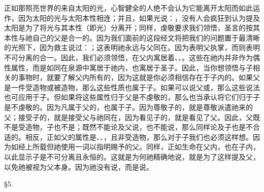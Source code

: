 正如那照亮世界的来自太阳的光，心智健全的人绝不会认为它能离开太阳而如此运作，因为太阳的光与太阳本性相连；并且，如果光说：，没有人会疯狂到认为提及太阳是为了将光与其本性（即光）分离开；同样，虔敬要求我们领悟，圣言的按其本性与祂自己的父是合一的。因为我们面前的这段经文将把我们的问题置于最清晰的光照下，因为救主说过：；这表明祂永远与父同在。因为表明父执掌，而则表明不可分离的合一。因此，我们必须领悟，在父内寓居着、、。这些在祂内并非作为偶性属性，而是如同在泉源中寓居于祂内，也寓居于圣子。因此，当你想领悟与子相关的事物时，就要了解父内所有的，因为这就是你必须相信存在于子内的。如果父是一件受造物或被造物，那么这些性质也属于子。如果可以说父或，那么这些说法也可应用于子。但如果将这些属性归于父是不虔敬的，那么也当承认将它们归于子是不虔敬的。因为凡属于父的，也属于子。因为尊敬子的，就是尊敬派遣祂来的父；接受子的，就是接受父与祂同在，因为看见子的，就是看见了父。因此，父既不是受造物，子也不是；既然不能论及父说，也不能说，那么同样论及子也是不合适的。相反，正如父的属性是、、，且非受造物，那么对于子我们也必须这样想。因为如经上所载但祂使用一词以指明赐予的父。同样，正如生命在父内，也在子内，以此显示子是不可分离且永恒的。这就是为何祂精确地说，就是为了这样提及父，以免祂被视为父本身。因为祂没有说，而是说。\par

§5. \par

